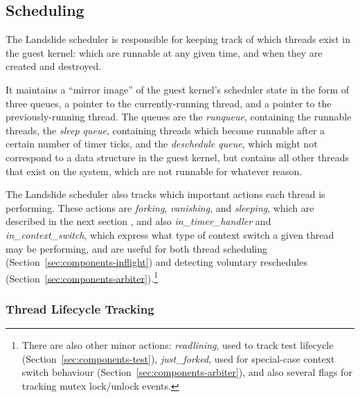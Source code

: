 \subsection{Scheduling}
\label{sec:components-sched}

The Landslide scheduler is responsible for keeping track of which threads exist in the guest kernel: which are runnable at any given time, and when they are created and destroyed.

It maintains a ``mirror image'' of the guest kernel's scheduler state in the form of three queues, a pointer to the currently-running thread, and a pointer to the previously-running thread. The queues are the {\em runqueue}, containing the runnable threads, the {\em sleep queue}, containing threads which become runnable after a certain number of timer ticks, and the {\em deschedule queue}, which might not correspond to a data structure in the guest kernel, but contains all other threads that exist on the system, which are not runnable for whatever reason.

The Landslide scheduler also tracks which important actions each thread is performing. These actions are {\em forking}, {\em vanishing}, and {\em sleeping}, which are described in the next section , and also {\em in\_timer\_handler} and {\em in\_context\_switch}, which express what type of context switch a given thread may be performing, and are useful for both thread scheduling (Section~\ref{sec:components-inflight}) and detecting voluntary reschedules (Section~\ref{sec:components-arbiter}).\footnote{
There are also other minor actions: {\em readlining}, used to track test lifecycle (Section~\ref{sec:components-test}), {\em just\_forked}, used for special-case context switch behaviour (Section~\ref{sec:components-arbiter}), and also several flags for tracking mutex lock/unlock events.}

\subsubsection{Thread Lifecycle Tracking}

